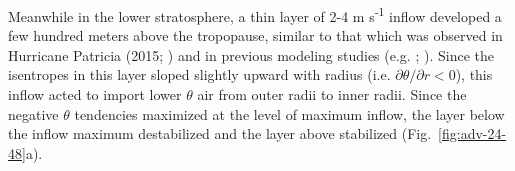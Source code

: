 %

Meanwhile in the lower stratosphere, a thin layer of 2-4 m s\textsuperscript{-1} inflow developed a few hundred meters above the tropopause, similar to that which was observed in Hurricane Patricia (2015; \citeauthor{DuranMolinari2018} \citeyear{DuranMolinari2018}) and in previous modeling studies (e.g. \citeauthor{OhnoSatoh2015} \citeyear{OhnoSatoh2015}; \citeauthor{Kieuetal2016} \citeyear{Kieuetal2016}).
Since the isentropes in this layer sloped slightly upward with radius (i.e. $\partial \theta/\partial r < 0$), this inflow acted to import lower $\theta$ air from outer radii to inner radii.
Since the negative $\theta$ tendencies maximized at the level of maximum inflow, the layer below the inflow maximum destabilized and the layer above stabilized (Fig.~\ref{fig:adv-24-48}a).

